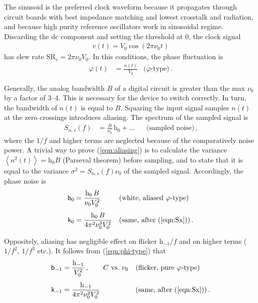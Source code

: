 \documentclass{article}
\newcommand{\req}[1]{(\ref{#1})}
\begin{document}
The sinusoid is the preferred clock waveform because it propagates through circuit boards with best impedance matching and lowest crosstalk and radiation, and because high purity reference oscillators work in sinusoidal regime.
Discarding the dc component and setting the threshold at 0, the clock signal
\begin{align}
v(t)=V_0\cos(2\pi\nu_0t)
\label{eqn:clock}
\end{align}
has slew rate $\mathrm{SR}_v=2\pi\nu_0V_0$.
In this conditions, the phase fluctuation is
\begin{align}
\label{eqn:phi-type}
\varphi(t)&=\frac{n(t)}{V_0}
&\text{($\varphi$-type)}\,.
\end{align}

Generally, the analog bandwidth $B$ of a digital circuit is greater than the max $\nu_{0}$ by a factor of 3--4.  This is necessary for the device to switch correctly.  In turn, the bandwidth of $n(t)$ is equal to $B$.
Squaring the input signal samples $n(t)$ at the zero crossings introduces aliasing.  The spectrum of the sampled signal is
\begin{align}
S_{n,s}(f)&=\frac{B}{\nu_0}\,\mathrm{h}_{0}+\ldots
&&\text{(sampled noise)}\,,
\label{eqn:aliasing}
\end{align}
where the $1/f$ and higher terms are neglected because of the comparatively noise power.
A trivial way to prove \req{eqn:aliasing} is to calculate the variance 
$\left<n^2(t)\right>=\mathrm{h_0}B$ (Parseval theorem) before sampling, and to state that it is equal to the variance $\sigma^2=S_{n,s}(f)\nu_0$ of the sampled signal.
Accordingly, the phase noise is
\begin{align}
\label{eqn:aliased-phi-type}
\mathsf{b}_0&=\frac{\mathrm{h}_{0}\,B}{\nu_0V_0^2}
&&\text{(white, aliased $\varphi$-type)}\\[1ex]
\label{eqn:aliased-phi-type-x}
\mathsf{k}_0&=\frac{\mathrm{h}_{0}\,B}{4\pi^2\nu_0^3V_0^2}
&&\text{(same, after \req{eqn:Sx})}\,.
\end{align}

Oppositely, aliasing has negligible effect on flicker $\mathrm{h}_{-1}/f$ and on higher terms ($1/f^2$, $1/f^3$ etc.).  It follows from \req{eqn:phi-type} that
\begin{align}
\label{eqn:pure-phi-type}
\mathsf{b}_{-1}&=\frac{\mathrm{h}_{-1}}{V_0^2}\,,
\qquad C~\text{vs.}~\nu_0
&&\text{(flicker, pure $\varphi$-type)}\\[1ex]
\label{eqn:pure-phi-type-x}
\mathsf{k}_{-1}&=\frac{\mathrm{h}_{-1}}{4\pi^2\nu_0^2V_0^2}
&&\text{(same, after \req{eqn:Sx})}\,.
\end{align}
\end{document}
